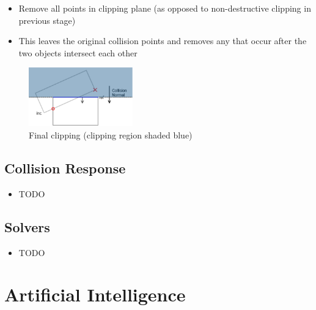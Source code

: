 \documentclass[a4paper]{article}
\begin{document}
\begin{enumerate}
\begin{itemize}
      \item
        Remove all points in clipping plane (as opposed to non-destructive
        clipping in previous stage)

      \item
        This leaves the original collision points and removes any that occur
        after the two objects intersect each other

    \end{itemize}

    \begin{figure}[h!]
      \centering
      \includegraphics[width=0.4\textwidth]{graphics/manifolds_clipping_4.eps}
      \caption{Final clipping (clipping region shaded blue)}
      \label{fig:manifolds_clipping_4}
    \end{figure}
    \FloatBarrier

\end{enumerate}

\subsection{Collision Response}

\begin{itemize}
  \item
    TODO

\end{itemize}

\subsection{Solvers}

\begin{itemize}
  \item
    TODO

\end{itemize}

\section{Artificial Intelligence}
\end{document}
